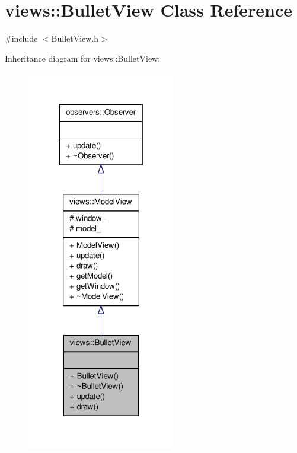\hypertarget{classviews_1_1BulletView}{\section{views\-:\-:\-Bullet\-View \-Class \-Reference}
\label{d8/df6/classviews_1_1BulletView}
}


{\ttfamily \#include $<$\-Bullet\-View.\-h$>$}



\-Inheritance diagram for views\-:\-:\-Bullet\-View\-:
\nopagebreak
\begin{figure}[H]
\begin{center}
\leavevmode
\includegraphics[width=184pt]{dc/dfb/classviews_1_1BulletView__inherit__graph}
\end{center}
\end{figure}


